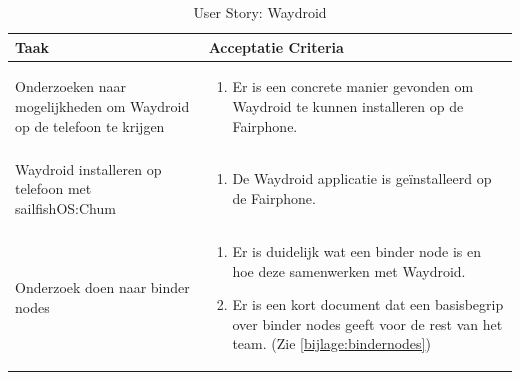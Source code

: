 \documentclass[a4paper]{report}
\newcommand{\userstorycolor}{PeachPuff1}
\begin{document}
\begin{tcolorbox}[colback=white, coltitle=black, colframe=\userstorycolor, title=\textbf{User Story: }Als developer wil ik Waydroid als package kunnen bouwen\, zodat er android apps op de telefoon gerund kunnen worden.]
  \begin{table}[H]
      \centering
    \begin{tabularx}{1\textwidth}{|X|X|}
      \hline
      \cellcolor[HTML]{ffcc99} \textbf{Taak} & \cellcolor[HTML]{ffcc99} \textbf{Acceptatie Criteria} \\ 
      \hline
      Onderzoeken naar mogelijkheden om Waydroid op de telefoon te krijgen & 
        \begin{enumerate}[leftmargin=.4cm, topsep=0cm, itemsep=.2cm]
          \item Er is een concrete manier gevonden om Waydroid te kunnen installeren op de Fairphone.
        \end{enumerate}
      \\
      \hline
      Waydroid installeren op telefoon met sailfishOS:Chum & 
        \begin{enumerate}[leftmargin=.4cm, topsep=0cm, itemsep=.2cm]
          \item De Waydroid applicatie is geïnstalleerd op de Fairphone.
        \end{enumerate}
      \\
      \hline
      Onderzoek doen naar binder nodes & 
        \begin{enumerate}[leftmargin=.4cm, topsep=0cm, itemsep=.2cm]
          \item Er is duidelijk wat een binder node is en hoe deze samenwerken met Waydroid. 
          \item Er is een kort document dat een basisbegrip over binder nodes geeft voor de rest van het team. (Zie \ref{bijlage:bindernodes})
        \end{enumerate}
      \\
      \hline
      
    \end{tabularx}
    \caption{User Story: Waydroid}
  \label{table:it5:story_waydroid}
  \end{table}
  \end{tcolorbox}
  
\end{document}
